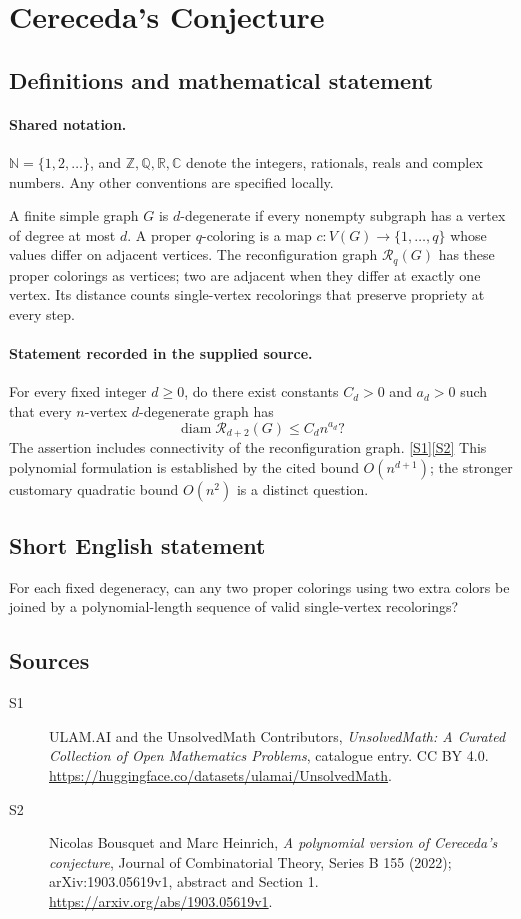 \documentclass[11pt]{article}
\newcommand{\sref}[2]{\hyperlink{source:#1:#2}{[S#2]}}
\begin{document}
\section{Cereceda's Conjecture}\label{statement}

\subsection{Definitions and mathematical statement}

\paragraph{Shared notation.}$\mathbb N=\{1,2,\ldots\}$, and $\mathbb Z,\mathbb Q,\mathbb R,\mathbb C$ denote the integers, rationals, reals and complex numbers. Any other conventions are specified locally.


A finite simple graph $G$ is $d$-degenerate if every nonempty subgraph has a vertex of degree at most $d$. A proper $q$-coloring is a map $c:V(G)\to\{1,\ldots,q\}$ whose values differ on adjacent vertices. The reconfiguration graph $\mathcal R_q(G)$ has these proper colorings as vertices; two are adjacent when they differ at exactly one vertex. Its distance counts single-vertex recolorings that preserve propriety at every step.
\paragraph{Statement recorded in the supplied source.}
For every fixed integer $d\ge0$, do there exist constants $C_d>0$ and $a_d>0$ such that every $n$-vertex $d$-degenerate graph has
\[
 \operatorname{diam}\mathcal R_{d+2}(G)\le C_d n^{a_d}?
\]
The assertion includes connectivity of the reconfiguration graph. \sref{statement}{1}\sref{statement}{2}
This polynomial formulation is established by the cited bound $O(n^{d+1})$; the stronger customary quadratic bound $O(n^2)$ is a distinct question.
\subsection{Short English statement}
For each fixed degeneracy, can any two proper colorings using two extra colors be joined by a polynomial-length sequence of valid single-vertex recolorings?
\subsection{Sources}
\begin{description}
\item[\hypertarget{source:statement:1}{S1}] ULAM.AI and the UnsolvedMath Contributors, \emph{UnsolvedMath: A Curated Collection of Open Mathematics Problems}, catalogue entry. CC BY 4.0. \url{https://huggingface.co/datasets/ulamai/UnsolvedMath}.
\item[\hypertarget{source:statement:2}{S2}] Nicolas Bousquet and Marc Heinrich, \emph{A polynomial version of Cereceda's conjecture}, Journal of Combinatorial Theory, Series B 155 (2022); arXiv:1903.05619v1, abstract and Section 1. \url{https://arxiv.org/abs/1903.05619v1}.
\end{description}
\label{end:statement}
\end{document}
